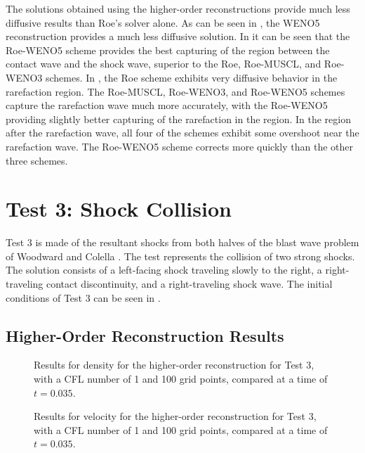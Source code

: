 The solutions obtained using the higher-order reconstructions provide much less diffusive results than Roe's solver alone. As can be seen in , the WENO5 reconstruction provides a much less diffusive solution. In  it can be seen that the Roe-WENO5 scheme provides the best capturing of the region between the contact wave and the shock wave, superior to the Roe, Roe-MUSCL, and Roe-WENO3 schemes. In , the Roe scheme exhibits very diffusive behavior in the rarefaction region. The Roe-MUSCL, Roe-WENO3, and Roe-WENO5 schemes capture the rarefaction wave much more accurately, with the Roe-WENO5 providing slightly better capturing of the rarefaction in the region. In the region after the rarefaction wave, all four of the schemes exhibit some overshoot near the rarefaction wave. The Roe-WENO5 scheme corrects more quickly than the other three schemes.


\section{Test 3: Shock Collision}
Test 3 is made of the resultant shocks from both halves of the blast wave problem of Woodward and Colella \cite{WOODWARD1984115}. The test represents the collision of two strong shocks. The solution consists of a left-facing shock traveling slowly to the right, a right-traveling contact discontinuity, and a right-traveling shock wave. The initial conditions of Test 3 can be seen in .
\subsection{Higher-Order Reconstruction Results}
\begin{figure}
	\caption[Results for density for the higher-order reconstruction for Test 3, with a CFL number of 1 and 100 grid points, compared at a time of $t=0.035$.]{Results for density for the higher-order reconstruction for Test 3, with a CFL number of 1 and 100 grid points, compared at a time of $t=0.035$.}
	\label{fig:Test4HORdensity}
\end{figure}

\begin{figure}
	\caption[Results for velocity for the higher-order reconstruction for Test 3, with a CFL number of 1 and 100 grid points, compared at a time of $t=0.035$.]{Results for velocity for the higher-order reconstruction for Test 3, with a CFL number of 1 and 100 grid points, compared at a time of $t=0.035$.}
	\label{fig:Test4HORvelocity}
\end{figure}

